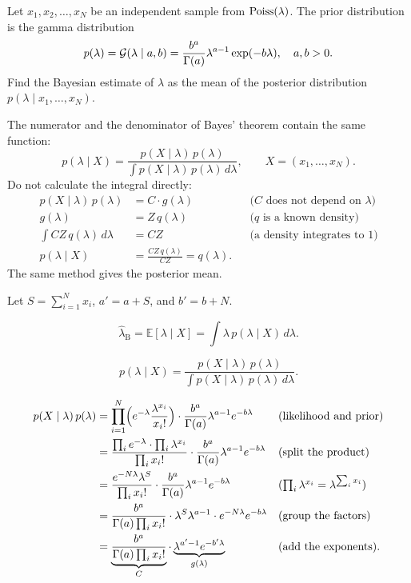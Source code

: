 \label{prob:poisson-gamma}
Let $x_1, x_2, \ldots, x_N$ be an independent sample from $\operatorname{Poiss}(\lambda)$.
The prior distribution is the gamma distribution
\[
  p(\lambda) = \mathcal{G}(\lambda \mid a, b)
  = \frac{b^a}{\Gamma(a)} \lambda^{a - 1} \exp(-b \lambda),
  \quad a, b > 0.
\]
Find the Bayesian estimate of $\lambda$ as the mean of the posterior
distribution $p(\lambda \mid x_1, \ldots, x_N)$.

\begin{solution}
The numerator and the denominator of Bayes' theorem contain the same
function:
\[
  p(\lambda \mid X)
  = \frac{p(X \mid \lambda) \, p(\lambda)}
         {\int p(X \mid \lambda) \, p(\lambda) \, d\lambda},
  \qquad X = (x_1, \ldots, x_N).
\]
Do not calculate the integral directly:
\begin{align*}
  p(X \mid \lambda) \, p(\lambda) &= C \cdot g(\lambda)
    && \text{($C$ does not depend on $\lambda$)} \\
  g(\lambda) &= Z \, q(\lambda)
    && \text{($q$ is a known density)} \\
  \int C Z \, q(\lambda) \, d\lambda &= C Z
    && \text{(a density integrates to 1)} \\
  p(\lambda \mid X) &= \frac{C Z \, q(\lambda)}{C Z} = q(\lambda).
\end{align*}
The same method gives the posterior mean.

Let $S = \sum_{i=1}^{N} x_i$, $a' = a + S$, and $b' = b + N$.

\[
  \hat{\lambda}_{\mathrm{B}} = \mathbb{E}[\lambda \mid X]
  = \int \lambda \, p(\lambda \mid X) \, d\lambda.
\]

\[
  p(\lambda \mid X)
  = \frac{p(X \mid \lambda) \, p(\lambda)}
         {\int p(X \mid \lambda) \, p(\lambda) \, d\lambda}.
\]

\begin{align*}
  p(X \mid \lambda) \, p(\lambda)
  &= \prod_{i=1}^{N} \Bigl( e^{-\lambda} \frac{\lambda^{x_i}}{x_i!} \Bigr)
     \cdot \frac{b^a}{\Gamma(a)} \lambda^{a-1} e^{-b\lambda}
    && \text{(likelihood and prior)} \\
  &= \frac{\prod_{i} e^{-\lambda} \cdot \prod_{i} \lambda^{x_i}}
          {\prod_{i} x_i!}
     \cdot \frac{b^a}{\Gamma(a)} \lambda^{a-1} e^{-b\lambda}
    && \text{(split the product)} \\
  &= \frac{e^{-N\lambda} \lambda^{S}}{\prod_{i} x_i!}
     \cdot \frac{b^a}{\Gamma(a)} \lambda^{a-1} e^{-b\lambda}
    && \textstyle\text{($\prod_i \lambda^{x_i} = \lambda^{\sum_i x_i}$)} \\
  &= \frac{b^a}{\Gamma(a) \prod_{i} x_i!}
     \cdot \lambda^{S} \lambda^{a-1} \cdot e^{-N\lambda} e^{-b\lambda}
    && \text{(group the factors)} \\
  &= \underbrace{\frac{b^a}{\Gamma(a) \prod_{i} x_i!}}_{C}
     \cdot
     \underbrace{\lambda^{a' - 1} e^{-b'\lambda}}_{g(\lambda)}
    && \text{(add the exponents)}.
\end{align*}


\end{solution}
